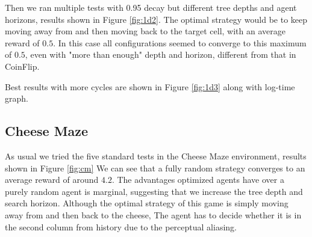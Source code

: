 \documentclass{article}
\let\Oldsubsection\subsection
\renewcommand{\subsection}{\FloatBarrier\Oldsubsection}
\begin{document}
\begin{flushleft}
Then we ran multiple tests with 0.95 decay but different tree depths and 
agent horizons, results shown in Figure \ref{fig:1d2}.
The optimal strategy would be to keep moving away from 
and then moving back to the target cell,
with an average reward of $0.5$.
In this case all configurations seemed to converge to this maximum of $0.5$,
even with "more than enough" depth and horizon,
different from that in CoinFlip.

Best results with more cycles are shown in Figure \ref{fig:1d3} along with log-time graph.

\newpage

\begin{figure}

\end{figure}

\newpage

\subsection{Cheese Maze}

As usual we tried the five standard tests
in the Cheese Maze environment, results shown in Figure \ref{fig:cm}
We can see that a fully random strategy converges to
an average reward of around $4.2$.
The advantages optimized agents have over a purely random agent
is marginal, suggesting that we increase the tree depth
and search horizon.
Although the optimal strategy of this game is simply
moving away from and then back to the cheese,
The agent has to decide whether it is in 
the second column from history due to the perceptual aliasing.

\begin{figure}
\vspace{-30em}


\end{figure}
\end{flushleft}
\end{document}
